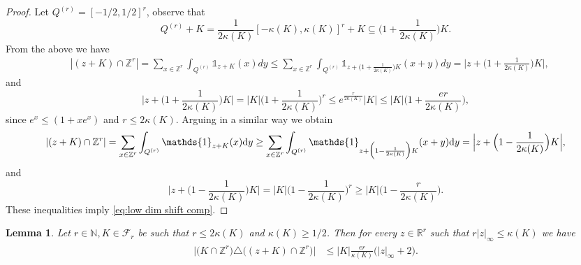 \documentclass[a4paper,oneside, reqno]{amsart}
\numberwithin{equation}{section}
\newtheorem{Lem}[Thm]{Lemma}
\theoremstyle{definition}%
\theoremstyle{definition}
\theoremstyle{definition}%
\theoremstyle{definition}
\newcommand{\Z}{\mathbb{Z}}
\newcommand{\R}{\mathbb{R}}
\newcommand{\N}{\mathbb{N}}
\begin{document}
\begin{proof}
Let $Q^{(r)}=[-1/2,1/2]^r$, observe that 
\[
Q^{(r)}+K= \frac{1}{2\kappa(K)}[-\kappa(K),\kappa(K)]^r+K \subseteq \Big(1+\frac{1}{2\kappa(K)}\Big)K.
\]
From the above we have
\begin{align*}
  &|(z+K)\cap\Z^r|=\sum_{x\in
                  \Z^r} \int_{Q^{(r)}}\mathds{1}_{z+K}(x) dy
                \le\sum_{x\in
                  \Z^r} \int_{Q^{(r)}}\mathds{1}_{z+\big(1+\frac{1}{2\kappa(K)}\big)K}(x+y)dy=\Big|z+\Big(1+\frac{1}{2\kappa(K)}\Big)K\Big|,
\end{align*}
and
\[
\Big|z+\Big(1+\frac{1}{2\kappa(K)}\Big)K\Big|=|K|\bigg(1+\frac{1}{2\kappa(K)}\bigg)^r\le
e^{\frac{r}{2\kappa(K)}}|K|\le |K|\big(1+ \frac{e r}{2\kappa(K)}\big),
\]
since $e^x\le(1+xe^x)$ and $r \le 2\kappa(K)$. Arguing in a similar way we obtain
\begin{align*}
  |(z+K)\cap\Z^r|=\sum_{x\in
                  \Z^r} \int_{Q^{(r)}}\mathds{1}_{z+K}(x){\rm d}y
                \ge\sum_{x\in
                  \Z^r} \int_{Q^{(r)}}\mathds{1}_{z+\Big(1-\frac{1}{2\kappa(K)}\Big)K}(x+y){\rm d}y=\Big|z+\Big(1-\frac{1}{2\kappa(K)}\Big)K\Big|,
\end{align*}
and
\[
\Big|z+\Big(1-\frac{1}{2\kappa(K)}\Big)K\Big|=|K|\bigg(1-\frac{1}{2\kappa(K)}\bigg)^r\ge
|K|\big(1- \frac{r}{2 \kappa(K)}\big).
\]
These inequalities imply \eqref{eq:low dim shift comp}.
\end{proof}



\begin{Lem}
\label{low dim shift sym diff}
Let $r\in\N, K \in \mathcal{F}_r $ be  such that   $r\le 2\kappa(K)$ and $\kappa(K) \ge 1/2$. Then for every $z\in\R^r$ such that $r|z|_{\infty} \le \kappa(K)$ we have
\begin{align}
  \label{eq:low dim shift sym diff}
  \begin{split}
  \big|\big(K\cap\Z^r\big)\triangle\big((z+K)\cap\Z^r\big)\big|&\le |K|\frac{er}{\kappa(K)}\Big(|z|_{\infty}+2\Big).
  \end{split}
\end{align}
\end{Lem}
\end{document}
